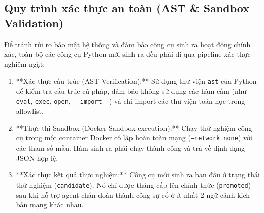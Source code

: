 \subsection{Quy trình xác thực an toàn (AST \& Sandbox Validation)}
Để tránh rủi ro bảo mật hệ thống và đảm bảo công cụ sinh ra hoạt động chính xác, toàn bộ các công cụ Python mới sinh ra đều phải đi qua pipeline xác thực nghiêm ngặt:
\begin{enumerate}
    \item **Xác thực cấu trúc (AST Verification):** Sử dụng thư viện \texttt{ast} của Python để kiểm tra cấu trúc cú pháp, đảm bảo không sử dụng các hàm cấm (như \texttt{eval}, \texttt{exec}, \texttt{open}, \texttt{\_\_import\_\_}) và chỉ import các thư viện toán học trong allowlist.
    \item **Thực thi Sandbox (Docker Sandbox execution):** Chạy thử nghiệm công cụ trong một container Docker cô lập hoàn toàn mạng (\texttt{--network none}) với các tham số mẫu. Hàm sinh ra phải chạy thành công và trả về định dạng JSON hợp lệ.
    \item **Xác thực kết quả thực nghiệm:** Công cụ mới sinh ra ban đầu ở trạng thái thử nghiệm (\texttt{candidate}). Nó chỉ được thăng cấp lên chính thức (\texttt{promoted}) sau khi hỗ trợ agent chẩn đoán thành công sự cố ở ít nhất 2 ngữ cảnh kịch bản mạng khác nhau.
\end{enumerate}